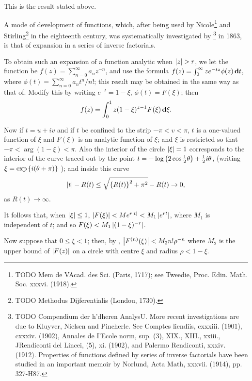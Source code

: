 This is the result stated above.


A mode of development of functions, which, after being used by
Nicole\footnote{TODO Mem de VAcad. des Sci. (Paris, 1717); see Tweedie, Proc. Edin. Math.
  Soc. xxxvi. (1918).}
and
Stirling\footnote{TODO Methodus Dijferentialis (Londou, 1730).}
in the eighteenth century, was systematically
investigated by
\Schlomilch\footnote{TODO Compendium der h'dheren AnalysU. More recent investigations are due
to Kluyver, Nielsen and Pincherle. See Comptes liendiis, cxxxiii.
(1901), cxxxiv. (1902), Annales de I'Ecole norm, sup. (3), XIX.,
XIII., xxiii., JRendiconti del Lincei, (5), xi. (1902), and Palermo
Rendiconti, xxxiv. (1912). Properties of functions defined by series
of inverse factorials have been studied in an important memoir by
Norlund, Acta Math, xxxvii. (1914), pp. 327-H87.}
in 1863, is that of expansion in a series
of inverse factorials.

To obtain such an expansion of a function analytic when
$\left| z \right| > r$, we let
the function be
$f(z) = \sum_{n=0}^{\infty} a_{n} z^{-n}$, and use the formula
$f(z) = \int_{0}^{\infty} z e^{-tz} \phi(z) \, \mathbf{d} t$,
where $\phi(t) = \sum_{n=0}^{\infty} a_{n} t^{n} / n!$;
this result may be obtained in the same way as
that of.
Modify this by writing
$e^{-t} = 1 - \xi$, $\phi(t) = F(\xi)$;
then
$$
f(z)
=
\int_{0}^{1}
z (1 - \xi)^{z-1} F(\xi) \, \mathbf{d} \xi.
$$

Now if $t = u + iv$ and if $t$ be confined to the strip
$-\pi < v < \pi$, $t$ is a
one-valued function of $\xi$ and $F(\xi)$ is an analytic function of
$\xi$; and $\xi$ is
restricted so that $-\pi < \arg (1-\xi) < \pi$. Also the interior of the
circle $\left| \xi \right| = 1$ corresponds
%
%
to the interior of the curve traced out by the point
$t = - \log \left( 2 \cos \frac{1}{2} \theta \right) + \frac{1}{2} i \theta$,
(writing $\xi= \exp \left\{ i (\theta + \pi)  \right\}$ ); and inside this curve
$$
\left| t \right| - R(t)
\leq
\sqrt{ \left\{ R(t) \right\}^{2} + \pi^{2} }
-
R(t)
\rightarrow
0,
$$
as $R(t) \rightarrow \infty$.

It follows that, when $\left| \xi \right| \leq 1$,
$\left| F(\xi) \right| < M e^{r\left| t \right|} < M_{1} \left| e^{rt} \right|$,
where $M_{1}$ is independent of $t$; and so
$F(\xi) < M_{1} \left| (1-\xi)^{-r} \right|$.

Now suppose that $0 \leq \xi < 1$; then, by
,
$\left| F^{(n)}(\xi) \right| < M_{2} n! \rho^{-n}$
where $M_{2}$ is the upper bound of
$\left| F(z) \right|$ on a circle with centre $\xi$ and
radius $\rho < 1 - \xi$.

